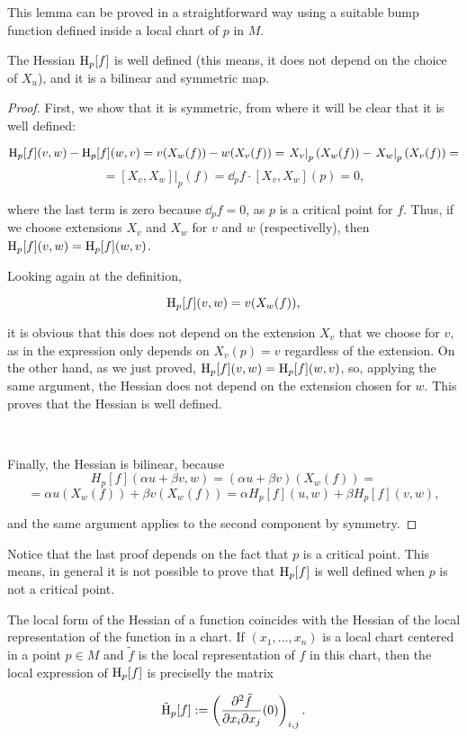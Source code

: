 This lemma can be proved in a straightforward way using a suitable bump function defined inside a local chart of $p$ in $M$.

\begin{lema}
	The Hessian $\operatorname H_p[f]$ is well defined (this means, it does not depend on the choice of $X_u$), and it is a bilinear and symmetric map.
\end{lema}

\begin{proof}
	First, we show that it is symmetric, from where it will be clear that it is well defined:

$$\operatorname H_p[f](v,w) - \operatorname H_p[f](w,v) = v(X_w(f)) - w(X_v(f)) = \left. X_v \right|_p(X_w(f)) - \left. X_w \right|_p (X_v(f)) = $$ 
$$= \left. [X_v,X_w] \right|_p(f) = \dd_p f \cdot [X_v,X_w](p) = 0 ,$$

where the last term is zero because $\dd_p f = 0$, as $p$ is a critical point for $f$. Thus, if we choose extensions $X_v$ and $X_w$ for $v$ and $w$ (respectivelly), then $\operatorname H_p[f](v,w) = \operatorname H_p[f](w,v)$.

Looking again at the definition,

$$\operatorname H_p[f](v,w) = v(X_w(f)),$$

it is obvious that this does not depend on the extension $X_v$ that we choose for $v$, as in the expression only depends on $X_v(p) = v$ regardless of the extension. On the other hand, as we just proved, $\operatorname H_p[f](v,w) = \operatorname H_p[f](w,v)$, so, applying the same argument, the Hessian does not depend on the extension chosen for $w$. This proves that the Hessian is well defined.

\

Finally, the Hessian is bilinear, because
$$H_p[f](\alpha u + \beta v, w) = (\alpha u + \beta v)(X_w(f)) = $$
$$= \alpha u(X_w(f)) + \beta v(X_w(f)) = \alpha H_p[f](u,w) + \beta H_p[f](v,w) ,$$

and the same argument applies to the second component by symmetry.
\end{proof}

Notice that the last proof depends on the fact that $p$ is a critical point. This means, in general it is not possible to prove that $\operatorname H_p[f]$ is well defined when $p$ is not a critical point.

\begin{rmrk}
	The local form of the Hessian of a function coincides with the Hessian of the local representation of the function in a chart. If $(x_1,...,x_n)$ is a local chart centered in a point $p \in M$ and $\tilde{f}$ is the local representation of $f$ in this chart, then the local expression of $\operatorname H_p[f]$ is preciselly the matrix

\begin{displaymath}
	\tilde{\operatorname H}_p[f] := \left( \frac{\partial^2 \tilde{f}}{\partial x_i \partial x_j}(0) \right)_{i,j} .
\end{displaymath}
\end{rmrk}

